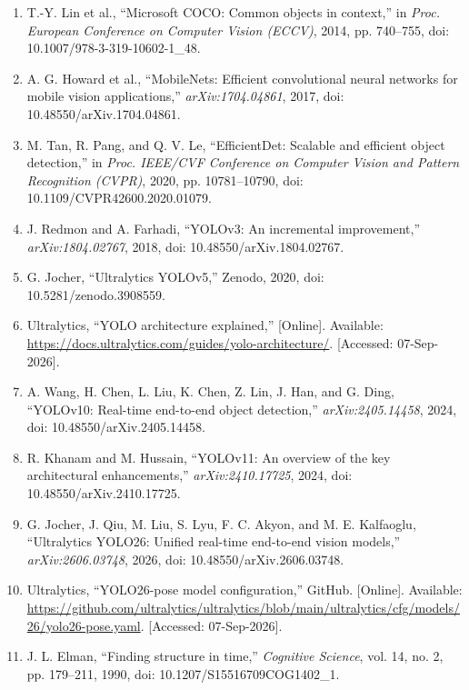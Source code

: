 \begin{enumerate}
    \item \label{ref:coco} T.-Y. Lin et al., ``Microsoft COCO: Common objects in context,'' in \textit{Proc. European Conference on Computer Vision (ECCV)}, 2014, pp. 740--755, doi: 10.1007/978-3-319-10602-1\_48.
    \item \label{ref:mobilenet} A. G. Howard et al., ``MobileNets: Efficient convolutional neural networks for mobile vision applications,'' \textit{arXiv:1704.04861}, 2017, doi: 10.48550/arXiv.1704.04861.
    \item \label{ref:efficientdet} M. Tan, R. Pang, and Q. V. Le, ``EfficientDet: Scalable and efficient object detection,'' in \textit{Proc. IEEE/CVF Conference on Computer Vision and Pattern Recognition (CVPR)}, 2020, pp. 10781--10790, doi: 10.1109/CVPR42600.2020.01079.
    \item \label{ref:yolov3} J. Redmon and A. Farhadi, ``YOLOv3: An incremental improvement,'' \textit{arXiv:1804.02767}, 2018, doi: 10.48550/arXiv.1804.02767.
    \item \label{ref:yolov5} G. Jocher, ``Ultralytics YOLOv5,'' Zenodo, 2020, doi: 10.5281/zenodo.3908559.
    \item \label{ref:yolo_arch_docs} Ultralytics, ``YOLO architecture explained,'' [Online]. Available: \url{https://docs.ultralytics.com/guides/yolo-architecture/}. [Accessed: 07-Sep-2026].
    \item \label{ref:yolov10} A. Wang, H. Chen, L. Liu, K. Chen, Z. Lin, J. Han, and G. Ding, ``YOLOv10: Real-time end-to-end object detection,'' \textit{arXiv:2405.14458}, 2024, doi: 10.48550/arXiv.2405.14458.
    \item \label{ref:yolov11} R. Khanam and M. Hussain, ``YOLOv11: An overview of the key architectural enhancements,'' \textit{arXiv:2410.17725}, 2024, doi: 10.48550/arXiv.2410.17725.
    \item \label{ref:yolo26} G. Jocher, J. Qiu, M. Liu, S. Lyu, F. C. Akyon, and M. E. Kalfaoglu, ``Ultralytics YOLO26: Unified real-time end-to-end vision models,'' \textit{arXiv:2606.03748}, 2026, doi: 10.48550/arXiv.2606.03748.
    \item \label{ref:yolo26_pose_config} Ultralytics, ``YOLO26-pose model configuration,'' GitHub. [Online]. Available: \url{https://github.com/ultralytics/ultralytics/blob/main/ultralytics/cfg/models/26/yolo26-pose.yaml}. [Accessed: 07-Sep-2026].
    \item \label{ref:rnn} J. L. Elman, ``Finding structure in time,'' \textit{Cognitive Science}, vol. 14, no. 2, pp. 179--211, 1990, doi: 10.1207/S15516709COG1402\_1.

\end{enumerate}

